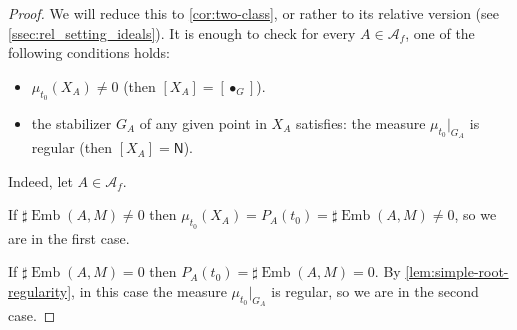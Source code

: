\documentclass[11pt,a4paper]{amsart}
\theoremstyle{plain}%
\theoremstyle{definition}
\theoremstyle{remark}
\newcommand{\Emb}{\operatorname{Emb}}
\begin{document}
\begin{proof} We will reduce this to \cref{cor:two-class}, or rather to its relative version (see \cref{ssec:rel_setting_ideals}). It is enough to check for every $A\in \mathcal{A}_f$, one of the following conditions holds: 
\begin{itemize}
    \item $\mu_{t_0}(X_A)\neq 0$ (then $[X_A] = [\bullet_G]$).
    \item the stabilizer $G_A$ of any given point in $X_A$ satisfies: the measure $\mu_{t_0}\rvert_{G_A}$ is regular (then $[X_A] =  \mathsf N$). 
\end{itemize}
Indeed, let $A\in \mathcal{A}_f$. 

If $\sharp \Emb(A, M) \neq 0 $ then $\mu_{t_0}(X_A) = P_A(t_0) = \sharp \Emb(A, M)\neq 0$, so we are in the first case.

If $\sharp \Emb(A, M) =0$ then $P_A(t_0) = \sharp \Emb(A, M)=0$. By \cref{lem:simple-root-regularity}, in this case  the measure $\mu_{t_0}\rvert_{G_A}$ is regular, so we are in the second case. 



    
\end{proof}
    
\end{document}
